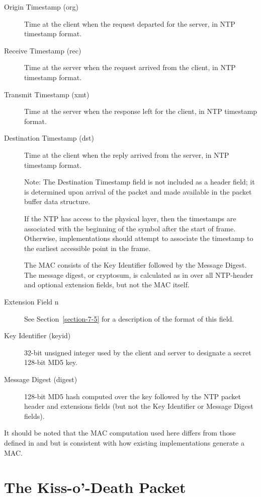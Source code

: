\begin{description}
\item[Origin Timestamp (org)] Time at the client when the request departed
for the server, in NTP timestamp format.

\item[Receive Timestamp (rec)] Time at the server when the request arrived
from the client, in NTP timestamp format.

\item[Transmit Timestamp (xmt)] Time at the server when the response left
for the client, in NTP timestamp format.

\item[Destination Timestamp (dst)] Time at the client when the reply
arrived from the server, in NTP timestamp format.

Note: The Destination Timestamp field is not included as a header
field; it is determined upon arrival of the packet and made available
in the packet buffer data structure.

If the NTP has access to the physical layer, then the timestamps are
associated with the beginning of the symbol after the start of frame.
Otherwise, implementations should attempt to associate the timestamp
to the earliest accessible point in the frame.

The MAC consists of the Key Identifier followed by the Message
Digest. The message digest, or cryptosum, is calculated as in
\cite{RFC1321} over all NTP-header and optional extension fields, but not
the MAC itself.

\item[Extension Field n] See Section~\ref{section-7-5} for a description of the format of
this field.

\item[Key Identifier (keyid)] 32-bit unsigned integer used by the client
and server to designate a secret 128-bit MD5 key.

\item[Message Digest (digest)] 128-bit MD5 hash computed over the key
followed by the NTP packet header and extensions fields (but not the
Key Identifier or Message Digest fields).

\end{description}

It should be noted that the MAC computation used here differs from
those defined in \cite{RFC1305} and \cite{RFC4330} but is consistent with how
existing implementations generate a MAC.

\section{The Kiss-o'-Death Packet}
\label{section-7-4}

